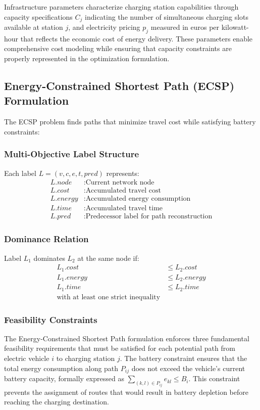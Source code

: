 \documentclass[12pt,a4paper]{article}
\begin{document}
Infrastructure parameters characterize charging station capabilities through capacity specifications $C_j$ indicating the number of simultaneous charging slots available at station $j$, and electricity pricing $p_j$ measured in euros per kilowatt-hour that reflects the economic cost of energy delivery. These parameters enable comprehensive cost modeling while ensuring that capacity constraints are properly represented in the optimization formulation.

\subsection{Energy-Constrained Shortest Path (ECSP) Formulation}

The ECSP problem finds paths that minimize travel cost while satisfying battery constraints:

\subsubsection{Multi-Objective Label Structure}
Each label $L = (v, c, e, t, pred)$ represents:
\begin{align}
L.node &: \text{Current network node} \\
L.cost &: \text{Accumulated travel cost} \\
L.energy &: \text{Accumulated energy consumption} \\
L.time &: \text{Accumulated travel time} \\
L.pred &: \text{Predecessor label for path reconstruction}
\end{align}

\subsubsection{Dominance Relation}
Label $L_1$ dominates $L_2$ at the same node if:
\begin{align}
L_1.cost &\leq L_2.cost \\
L_1.energy &\leq L_2.energy \\
L_1.time &\leq L_2.time \\
\text{with at least one strict inequality}
\end{align}

\subsubsection{Feasibility Constraints}
The Energy-Constrained Shortest Path formulation enforces three fundamental feasibility requirements that must be satisfied for each potential path from electric vehicle $i$ to charging station $j$. The battery constraint ensures that the total energy consumption along path $P_{ij}$ does not exceed the vehicle's current battery capacity, formally expressed as $\sum_{(k,l) \in P_{ij}} e_{kl} \leq B_i$. This constraint prevents the assignment of routes that would result in battery depletion before reaching the charging destination.
\end{document}
